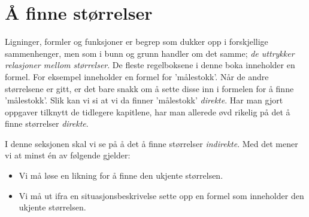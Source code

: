 





\section{Å finne størrelser}
Ligninger, formler og funksjoner er begrep som dukker opp i forskjellige sammenhenger, men som i bunn og grunn handler om det samme; \textsl{de uttrykker relasjoner mellom størrelser}. De fleste regelboksene i denne boka inneholder en formel. For eksempel inneholder  en formel for 'målestokk'. Når de andre størrelsene er gitt, er det bare snakk om å sette disse inn i formelen for å finne 'målestokk'. Slik kan vi si at vi da finner 'målestokk' \textsl{direkte}. Har man gjort oppgaver tilknytt de tidlegere kapitlene, har man allerede øvd rikelig på det å finne størrelser \textsl{direkte}.\vsk

I denne seksjonen skal vi se på å det å finne størrelser \textsl{indirekte}. Med det mener vi at minst én av følgende gjelder:
\begin{itemize}
	\item Vi må løse en likning for å finne den ukjente størrelsen.
	\item Vi må ut ifra en situasjonsbeskrivelse sette opp en formel som inneholder den ukjente størrelsen.
\end{itemize}


